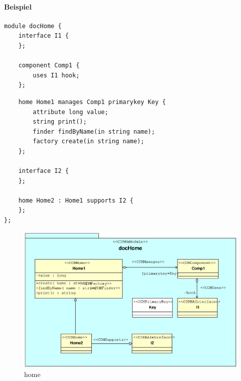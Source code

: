 \documentclass [a4paper,10pt] {scrartcl}
\begin{document}
\paragraph{Beispiel}
\begin{verbatim}
module docHome {
    interface I1 {
    };

    component Comp1 {
        uses I1 hook;
    };
\end{verbatim}
\newpage
\begin{verbatim}
    home Home1 manages Comp1 primarykey Key {
        attribute long value;
        string print();
        finder findByName(in string name);
        factory create(in string name);
    };

    interface I2 {
    };

    home Home2 : Home1 supports I2 {
    };
};
\end{verbatim}
\begin{figure}[!h]
\centerline{\includegraphics[width=1.2 \linewidth]{docHome.eps}}
\caption{home}
\label{fig:home}
\end{figure}

\cleardoublepage
\end{document}
